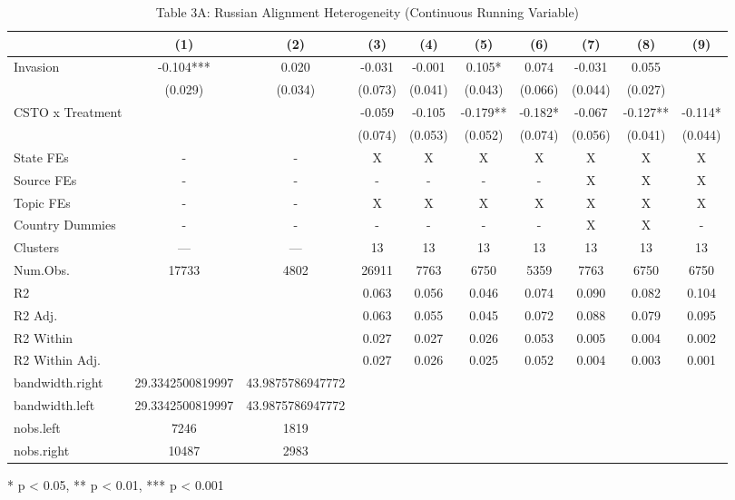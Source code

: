 \begin{table}[!t]
\caption{Table 3A: Russian Alignment Heterogeneity (Continuous Running Variable)} 
\fontsize{12.0pt}{14.4pt}\selectfont
\begin{tabular*}{\linewidth}{@{\extracolsep{\fill}}lccccccccc}
\toprule
  & (1) & (2) & (3) & (4) & (5) & (6) & (7) & (8) & (9) \\ 
\midrule\addlinespace[2.5pt]
Invasion & -0.104*** & 0.020 & -0.031 & -0.001 & 0.105* & 0.074 & -0.031 & 0.055 &  \\ 
 & (0.029) & (0.034) & (0.073) & (0.041) & (0.043) & (0.066) & (0.044) & (0.027) &  \\ 
CSTO x Treatment &  &  & -0.059 & -0.105 & -0.179** & -0.182* & -0.067 & -0.127** & -0.114* \\ 
{} & {} & {} & {(0.074)} & {(0.053)} & {(0.052)} & {(0.074)} & {(0.056)} & {(0.041)} & {(0.044)} \\ 
State FEs & - & - & X & X & X & X & X & X & X \\ 
Source FEs & - & - & - & - & - & - & X & X & X \\ 
Topic FEs & - & - & X & X & X & X & X & X & X \\ 
Country Dummies & - & - & - & - & - & - & X & X & - \\ 
Clusters & — & — & 13 & 13 & 13 & 13 & 13 & 13 & 13 \\ 
Num.Obs. & 17733 & 4802 & 26911 & 7763 & 6750 & 5359 & 7763 & 6750 & 6750 \\ 
R2 &  &  & 0.063 & 0.056 & 0.046 & 0.074 & 0.090 & 0.082 & 0.104 \\ 
R2 Adj. &  &  & 0.063 & 0.055 & 0.045 & 0.072 & 0.088 & 0.079 & 0.095 \\ 
R2 Within &  &  & 0.027 & 0.027 & 0.026 & 0.053 & 0.005 & 0.004 & 0.002 \\ 
R2 Within Adj. &  &  & 0.027 & 0.026 & 0.025 & 0.052 & 0.004 & 0.003 & 0.001 \\ 
bandwidth.right & 29.3342500819997 & 43.9875786947772 &  &  &  &  &  &  &  \\ 
bandwidth.left & 29.3342500819997 & 43.9875786947772 &  &  &  &  &  &  &  \\ 
nobs.left & 7246 & 1819 &  &  &  &  &  &  &  \\ 
nobs.right & 10487 & 2983 &  &  &  &  &  &  &  \\ 
\bottomrule
\end{tabular*}
\begin{minipage}{\linewidth}
* p < 0.05, ** p < 0.01, *** p < 0.001\\

\end{minipage}
\end{table}
